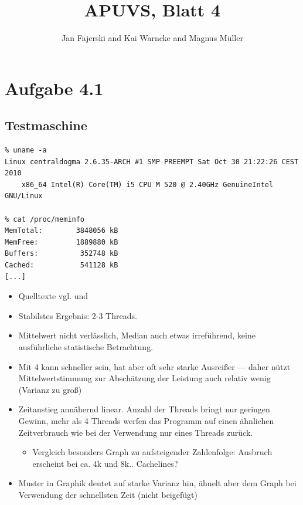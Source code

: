 \documentclass[a4paper,
12pt,
BCOR12mm,
]{scrartcl}
\title{APUVS, Blatt 4}
\author{Jan Fajerski and Kai Warncke and Magnus Müller}
\begin{document}

\maketitle 

\section*{Aufgabe 4.1}
\subsection{Testmaschine}
\begin{verbatim}
% uname -a
Linux centraldogma 2.6.35-ARCH #1 SMP PREEMPT Sat Oct 30 21:22:26 CEST 2010
	x86_64 Intel(R) Core(TM) i5 CPU M 520 @ 2.40GHz GenuineIntel GNU/Linux

% cat /proc/meminfo
MemTotal:        3848056 kB
MemFree:         1889880 kB
Buffers:          352748 kB
Cached:           541128 kB
[...]
\end{verbatim}

\begin{itemize}
	\item Quelltexte vgl. \pageref{src:sum} und \pageref{src:ascend}
	\item Stabilstes Ergebnis: 2-3 Threads.
	\item Mittelwert nicht verlässlich, Median auch etwas irreführend, keine ausführliche
		statistische Betrachtung.
	\item Mit 4 kann schneller sein, hat aber oft sehr starke Ausreißer --- daher nützt
		Mittelwertstimmung zur Abschätzung der Leistung auch relativ wenig (Varianz zu groß)
	\item Zeitanstieg annähernd linear. Anzahl der Threads bringt nur geringen Gewinn, mehr
		als 4 Threads werfen das Programm auf einen ähnlichen Zeitverbrauch wie bei der
		Verwendung nur eines Threads zurück.
		\begin{itemize}
			\item Vergleich besonders Graph zu aufsteigender Zahlenfolge: Ausbruch erscheint bei
				ca. 4k und 8k.. Cachelines?
		\end{itemize}
	\item Muster in Graphik deutet auf starke Varianz hin, ähnelt aber dem Graph bei
		Verwendung der schnellsten Zeit (nicht beigefügt)
\end{itemize}
\end{document}
